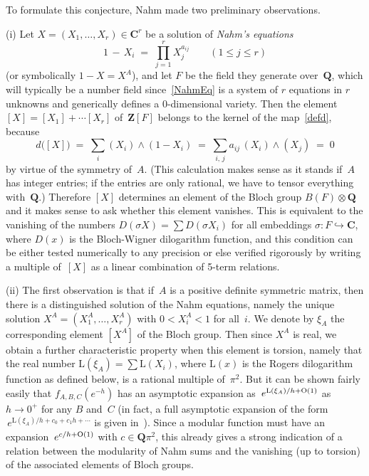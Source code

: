 \documentclass[12pt,reqno]{amsart}
\theoremstyle{definition}
\newcommand{\changed}[1]{{#1}}
\def\be{\begin{equation}}
\def\ee{\end{equation}}
\def\={\;=\;}
\def\Q{\mathbf Q}   %
\def\Z{\mathbf Z}   %
\def\C{\mathbf C}   %
\def\X{X}   %
\def\L{\mathrm L}
\begin{document}
To formulate this conjecture, Nahm made two preliminary observations.

\smallskip\noindent (i)
Let $\X=(X_1,\dots,X_r)\in\C^r$ be a solution of 
{\it Nahm's equations}
\be
\label{NahmEq}
1 \,-\, X_i \= \prod_{j=1}^r X_j^{a_{ij}} \qquad(1\le j\le r) 
\ee
(or symbolically $1-\X=\X^A$), and let $F$ be the field they generate 
over~$\Q$, which will typically be a number field since~\eqref{NahmEq} is 
a system of $r$ equations in $r$ unknowns and generically defines a 
0-dimensional variety. Then the element $[\X]=[X_1]+\cdots[X_r]$ of~$\Z[F]$
belongs to the kernel of the map~\eqref{defd}, because
$$ 
d\bigl([\X]\bigr) \= \sum_i(X_i)\wedge(1-X_i) \= 
\sum_{i,\,j} a_{ij}\,(X_i)\wedge(X_j)\=0 
$$
by virtue of the symmetry of~$A$.  (This calculation makes sense as it 
stands if~$A$ has integer entries; if the entries are only rational, we have 
to tensor everything with~$\Q$.) Therefore $[\X]$ determines an element of 
the Bloch group $B(F)\otimes\Q$ and it makes sense to ask whether this 
element vanishes. This is equivalent to the vanishing of the numbers 
$D(\sigma\X)=\sum D(\sigma X_i)$ for all embeddings $\sigma:F\hookrightarrow\C$,
where $D(x)$ is the Bloch-Wigner dilogarithm function, and this condition can 
be either tested numerically to any precision or else verified rigorously by 
writing a multiple of~$[\X]$ as a linear combination of 5-term relations.

\smallskip\noindent (ii) 
The first \changed{observation
is that if~$A$ is a positive definite symmetric matrix, then there is a}
distinguished solution of the 
Nahm equations, namely the unique solution
$\X^A=(X_1^A,\dots,X_r^A)$ with $0<X_i^A<1$ for all~$i$.  We denote by $\xi_A$ 
the corresponding element $[\X^A]$ of the Bloch group.  Then since $\X^A$ 
is real, we obtain a further characteristic property when this element is 
torsion, namely that the real number $\L(\xi_A)=\sum\L(X_i)$, 
where  $\L(x)$  is the Rogers dilogarithm function as defined below,
is a rational multiple of~$\pi^2$. But it can be shown fairly easily that 
$f_{A,B,C}(e^{-h})$ has an asymptotic expansion as $\,e^{\L(\xi_A)/h+\text O(1)}$ 
as $h\to0^+$ for any $B$ and~$C$ (in fact, a full asymptotic expansion of 
the form  $\,e^{\L(\xi_A)/h+c_0+c_1h+\cdots}$ is given in~\cite{Zagier}). Since 
a modular function must have an expansion $\,e^{c/h+\text O(1)}$ with 
$c\in\Q\pi^2$, this already gives a strong indication of a relation 
between the modularity of Nahm sums and the vanishing (up to torsion) of 
the associated elements of Bloch groups.
\end{document}
